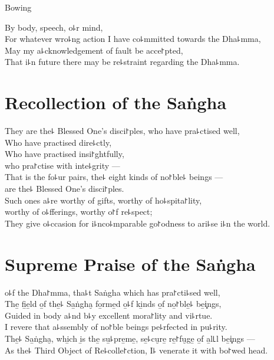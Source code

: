 \clearpage

\begin{instruction}
  Bowing
\end{instruction}

By body, speech, o꜕r mind,\\
For whatever wro꜕ng action I have co꜕mmitted towards the Dha꜕mma,\\
May my a꜕cknowledgement of fault be acce꜓pted,\\
That i꜕n future there may be re꜕straint regarding the Dha꜕mma.

\chapter{Recollection of the Saṅgha}

\begin{leader}
\end{leader}

They are the꜕ Blessed One's disci꜓ples, who have pra꜕ctised well,\\
Who have practised dire꜕ctly,\\
Who have practised insi꜓ghtfully,\\
 who pra꜓ctise with inte꜕grity ---\\
That is the fo꜕ur pairs, the꜕ eight kinds of no꜓ble꜕ beings ---\\
 are the꜕ Blessed One's disci꜓ples.\\
Such ones a꜕re worthy of gifts, worthy of ho꜕spita꜓lity,\\
\vin worthy of o꜕fferings, worthy o꜓f re꜕spect;\\
They give o꜕ccasion for i꜕nco꜕mparable go꜓odness to ari꜕se i꜕n the world.

\nextChapterUseDelegatedPageNumber

\chapter{Supreme Praise of the Saṅgha}

\begin{leader}
\end{leader}

 o꜕f the Dha꜓mma, tha꜕t Saṅgha which has pra꜓cti꜕sed well,\\
The̱ fi̱e̱ld o̱f the̱꜕ Sa̱ṅgha̮ fo̱rme̱d o̱꜕f  ki̱nds o̱f no̱꜓ble̱꜕ be̱i͓ngs,\\
Guided in body a꜕nd  b꜕y excellent mora꜓lity and vi꜕rtue.\\
I revere that a꜕ssembly of no꜓ble beings pe꜕rfected in pu꜕rity.\\
The̱꜕ Sa̱ṅgha̮, whi̱ch i̱s the̱ su̱꜕pre̱me̱, se̱꜕cu̮re̱ re̱꜓fu̮ge̱ o̱f a̱l꜖l be̱i͓ngs ---\\
As the꜕ Third Object of Re꜕colle꜓ction, I꜕ venerate it with bo꜓wed head.

